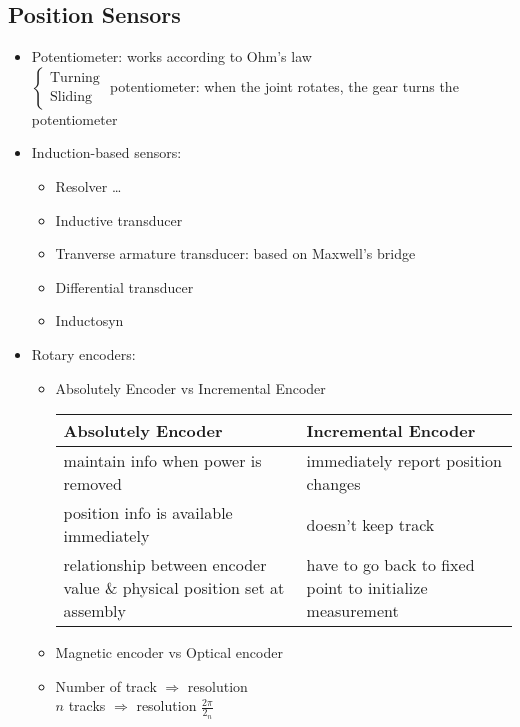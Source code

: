 \subsection{Position Sensors}
\begin{itemize}
	\item Potentiometer: works according to Ohm's law\\
	$\begin{cases}
		\text{Turning}\\
		\text{Sliding}
	\end{cases}$ potentiometer: when the joint rotates, the gear turns the potentiometer
	\item Induction-based sensors:
	\begin{itemize}
		\item Resolver \dots
		\item Inductive transducer
		\item Tranverse armature transducer: based on Maxwell's bridge
		\item Differential transducer
		\item Inductosyn
	\end{itemize}
	\item Rotary encoders:
	\begin{itemize}
		\item Absolutely Encoder \ac{vs} Incremental Encoder 
		\begin{table}[hbt!]
			\centering
			\begin{tabular}{p{7cm}|p{7cm}}
				Absolutely Encoder & Incremental Encoder\\\hline\hline
				maintain \ac{info} when power is removed & immediately report position changes\\
				position \ac{info} is available immediately & doesn't keep track\\
				relationship between encoder value \& physical position set at assembly & have to go back to fixed point to initialize measurement
			\end{tabular}
		\end{table}
		\item Magnetic encoder \ac{vs} Optical encoder
		\item Number of track $\Rightarrow$ resolution\\
		$n$ tracks $\Rightarrow$ resolution $\frac{2\pi}{2_n}$
	\end{itemize}
\end{itemize}
